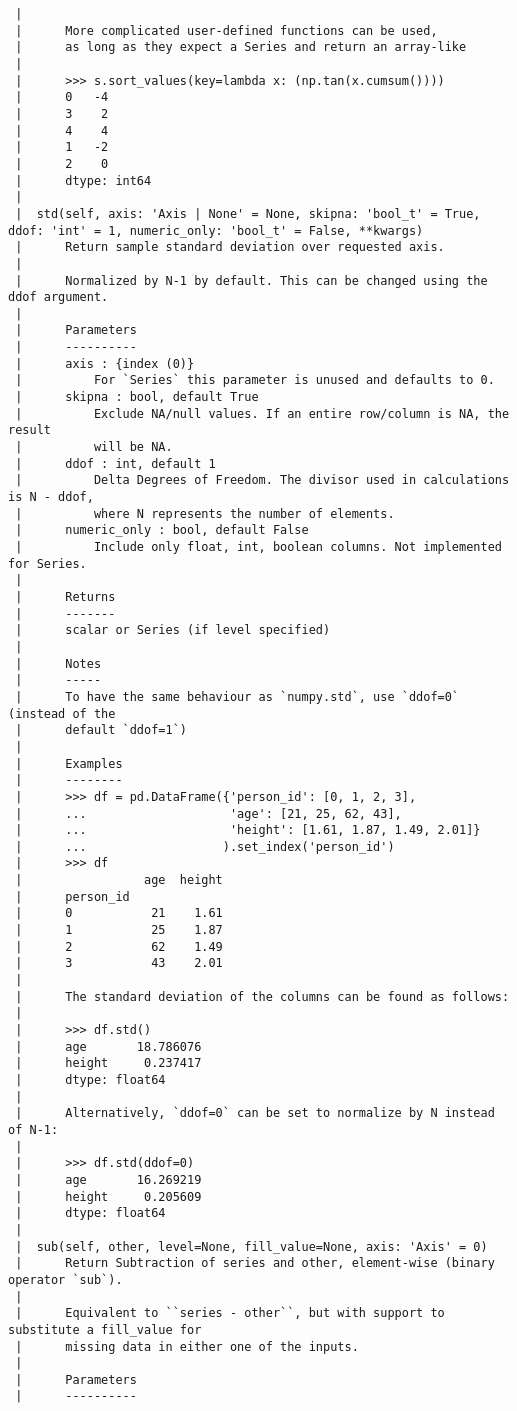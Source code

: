 \documentclass[
  letterpaper,
  DIV=11,
  numbers=noendperiod]{scrreprt}
\begin{document}
\begin{verbatim}
 |      
 |      More complicated user-defined functions can be used,
 |      as long as they expect a Series and return an array-like
 |      
 |      >>> s.sort_values(key=lambda x: (np.tan(x.cumsum())))
 |      0   -4
 |      3    2
 |      4    4
 |      1   -2
 |      2    0
 |      dtype: int64
 |  
 |  std(self, axis: 'Axis | None' = None, skipna: 'bool_t' = True, ddof: 'int' = 1, numeric_only: 'bool_t' = False, **kwargs)
 |      Return sample standard deviation over requested axis.
 |      
 |      Normalized by N-1 by default. This can be changed using the ddof argument.
 |      
 |      Parameters
 |      ----------
 |      axis : {index (0)}
 |          For `Series` this parameter is unused and defaults to 0.
 |      skipna : bool, default True
 |          Exclude NA/null values. If an entire row/column is NA, the result
 |          will be NA.
 |      ddof : int, default 1
 |          Delta Degrees of Freedom. The divisor used in calculations is N - ddof,
 |          where N represents the number of elements.
 |      numeric_only : bool, default False
 |          Include only float, int, boolean columns. Not implemented for Series.
 |      
 |      Returns
 |      -------
 |      scalar or Series (if level specified) 
 |      
 |      Notes
 |      -----
 |      To have the same behaviour as `numpy.std`, use `ddof=0` (instead of the
 |      default `ddof=1`)
 |      
 |      Examples
 |      --------
 |      >>> df = pd.DataFrame({'person_id': [0, 1, 2, 3],
 |      ...                    'age': [21, 25, 62, 43],
 |      ...                    'height': [1.61, 1.87, 1.49, 2.01]}
 |      ...                   ).set_index('person_id')
 |      >>> df
 |                 age  height
 |      person_id
 |      0           21    1.61
 |      1           25    1.87
 |      2           62    1.49
 |      3           43    2.01
 |      
 |      The standard deviation of the columns can be found as follows:
 |      
 |      >>> df.std()
 |      age       18.786076
 |      height     0.237417
 |      dtype: float64
 |      
 |      Alternatively, `ddof=0` can be set to normalize by N instead of N-1:
 |      
 |      >>> df.std(ddof=0)
 |      age       16.269219
 |      height     0.205609
 |      dtype: float64
 |  
 |  sub(self, other, level=None, fill_value=None, axis: 'Axis' = 0)
 |      Return Subtraction of series and other, element-wise (binary operator `sub`).
 |      
 |      Equivalent to ``series - other``, but with support to substitute a fill_value for
 |      missing data in either one of the inputs.
 |      
 |      Parameters
 |      ----------

\end{verbatim}
\end{document}
